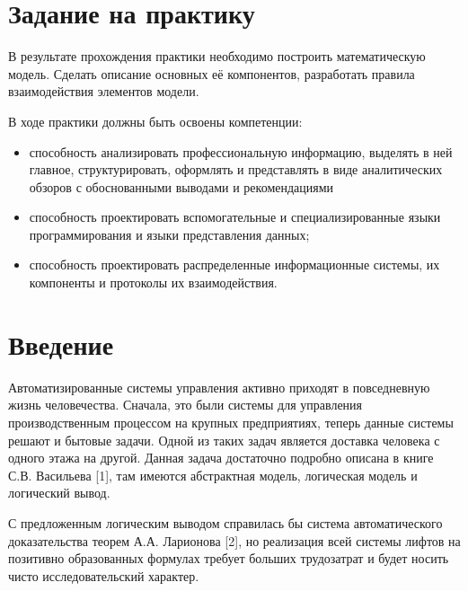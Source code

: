 \section{Задание на практику}
	В результате прохождения практики необходимо построить математическую модель.
		Сделать описание основных её компонентов, разработать правила взаимодействия 
		элементов модели.

	В ходе практики должны быть освоены компетенции:
		\begin{itemize}
			\item способность анализировать профессиональную информацию, выделять в ней главное, структурировать, оформлять и представлять в виде аналитических обзоров с обоснованными выводами и рекомендациями
			\item способность проектировать вспомогательные и специализированные языки программирования и языки представления данных;
			\item способность проектировать распределенные информационные системы, их компоненты и протоколы их взаимодействия.
		\end{itemize}

\newpage
\section{Введение}

Автоматизированные системы управления активно приходят в повседневную жизнь человечества. Сначала, это были системы для управления производственным процессом на крупных предприятиях, теперь данные системы решают и бытовые задачи. Одной из таких задач является доставка человека с одного этажа на другой. Данная задача достаточно подробно описана в книге С.В. Васильева [1], там имеются абстрактная модель, логическая модель и логический вывод.

С предложенным логическим выводом справилась бы система автоматического доказательства теорем А.А. Ларионова [2], но реализация всей системы лифтов на позитивно образованных формулах требует больших трудозатрат и будет носить чисто исследовательский характер.
